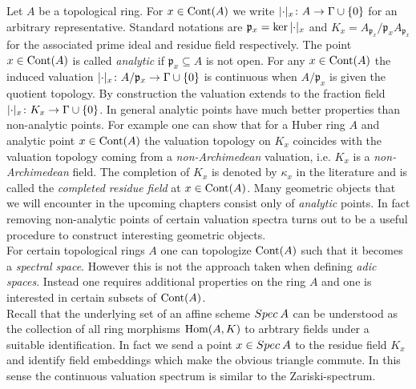 Let $A$ be a topological ring. For $x\in{\mathrm{Cont}(A)}$ we write $\lvert\cdot\rvert_{x}\colon A\to\Gamma\cup\{0\}$ for an arbitrary representative. 
Standard notations are $\mathfrak{p}_x=\ker{\lvert\cdot\rvert_{x}}$ and $K_x=A_{\mathfrak{p}_x}/{\mathfrak{p}_x}A_{\mathfrak{p}_x}$ for the associated prime ideal and residue field respectively.
The point $x\in{\mathrm{Cont}(A)}$ is called \emph{analytic} if $\mathfrak{p}_x\subseteq A$ is not open. 
For any $x\in{\mathrm{Cont}(A)}$ the induced valuation 
$\lvert\cdot\rvert_{x}\colon A/\mathfrak{p}_x\to\Gamma\cup\{0\}$ is continuous when $A/\mathfrak{p}_x$ is given the quotient topology. 
By construction the valuation extends to the fraction field
$\lvert\cdot\rvert_{x}\colon K_x\to\Gamma\cup\{0\}$. In general analytic points have much better properties than non-analytic points. For example one can show that
for a Huber ring $A$ and analytic point $x\in{\mathrm{Cont}(A)}$ the valuation topology on $K_x$ coincides with the valuation topology coming from a \emph{non-Archimedean} valuation, i.e. $K_x$ is a \emph{non-Archimedean}
field. %
The completion of $K_x$ is denoted by $\kappa_x$ in the literature and is called the \emph{completed residue field} 
at $x\in{\mathrm{Cont}(A)}$.
Many geometric objects that we will encounter in the upcoming chapters consist only of \emph{analytic} points. In fact removing non-analytic points of certain valuation spectra turns out to be a useful procedure to construct interesting geometric objects.\\

For certain topological rings $A$ one can topologize ${\mathrm{Cont}(A)}$ such that it becomes a \emph{spectral space}.  %
However this is not the approach taken when defining \emph{adic spaces}. Instead one requires additional properties on the ring $A$ and one is interested in certain subsets of ${\mathrm{Cont}(A)}$.\\

Recall that the underlying set of an affine scheme ${Spec{\:A}}$ can be understood as the collection of all ring morphisms ${\rm{Hom}}(A,K)$ to arbtrary fields under a suitable identification. In fact we send a point $x\in{Spec{\:A}}$ to 
the residue field $K_x$ and identify field embeddings which make the obvious triangle commute.
 In this sense the continuous valuation spectrum is similar to the Zariski-spectrum.



